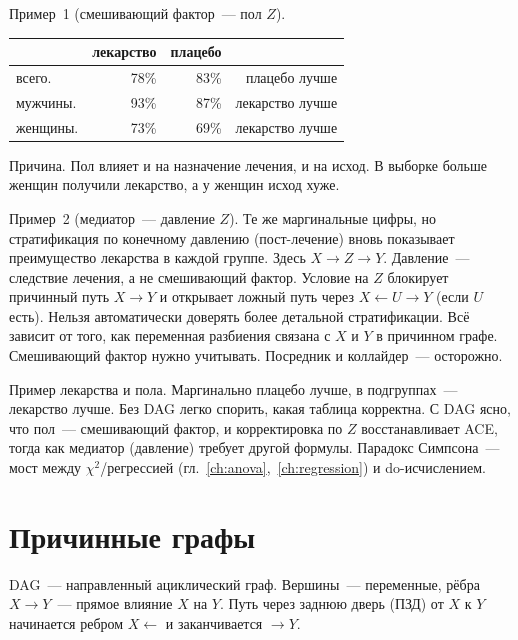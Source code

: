 Пример~1 (смешивающий фактор~--- пол $Z$).
\begin{center}
\small
\begin{tabular}{lrrr}
\toprule
 & лекарство & плацебо & \\
\midrule
всего.& 78\% & 83\% & плацебо лучше \\
мужчины.& 93\% & 87\% & лекарство лучше \\
женщины.& 73\% & 69\% & лекарство лучше \\
\bottomrule
\end{tabular}
\end{center}
Причина. Пол влияет и на назначение лечения, и на исход. В выборке больше женщин получили лекарство, а у женщин исход хуже.

Пример~2 (медиатор~--- давление $Z$). Те же маргинальные цифры, но стратификация по конечному давлению (пост-лечение) вновь показывает преимущество лекарства в каждой группе.
Здесь $X\to Z\to Y$. Давление~--- следствие лечения, а не смешивающий фактор. Условие на $Z$ блокирует причинный путь $X\to Y$ и открывает ложный путь через $X\leftarrow U\to Y$ (если $U$ есть).
Нельзя автоматически доверять более детальной стратификации. Всё зависит от того, как переменная разбиения связана с $X$ и $Y$ в причинном графе.
Смешивающий фактор нужно учитывать. Посредник и коллайдер~--- осторожно.

Пример лекарства и пола. Маргинально плацебо лучше, в подгруппах~--- лекарство лучше.
Без DAG легко спорить, какая таблица корректна. С DAG ясно, что пол~--- смешивающий фактор, и корректировка по $Z$ восстанавливает ACE, тогда как медиатор (давление) требует другой формулы.
Парадокс Симпсона~--- мост между $\chi^2$/регрессией (гл.~\ref{ch:anova},~\ref{ch:regression}) и do-исчислением.

\section{Причинные графы}

\begin{definition}
DAG~--- направленный ациклический граф. Вершины~--- переменные, рёбра $X\to Y$~--- прямое влияние $X$ на $Y$.
Путь через заднюю дверь (ПЗД) от $X$ к $Y$ начинается ребром $X\leftarrow$ и заканчивается $\to Y$.
\end{definition}


